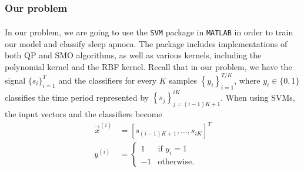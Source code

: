 \subsubsection{Our problem}
	In our problem, we are going to use the \verb!SVM! package in \verb!MATLAB!\textsuperscript{\textregistered} in order to train our model and classify sleep apnoea. The package includes implementations of both QP and SMO algorithms, as well as various kernels, including the polynomial kernel and the RBF kernel. Recall that in our problem, we have the signal $\{ s_i \}_{i = 1}^T$ and the classifiers for every $K$ samples $\left\{ y_i \right\}_{i = 1}^{T/K}$, where $y_i \in \{0, 1\}$ classifies the time period represented by $\left\{ s_j \right\}_{j = (i - 1)K + 1}^{iK}$. When using SVMs, the input vectors and the classifiers become
	\begin{align*}
		\vec x^{(i)} 	& = [ s_{ (i - 1)K + 1}, \dotsc, s_{iK} ]^T \\
		y^{(i)} 	& = 
		\begin{cases}
			1	& \text{if } y_i  = 1 \\
			-1	& \text{otherwise.}
		\end{cases}
	\end{align*}